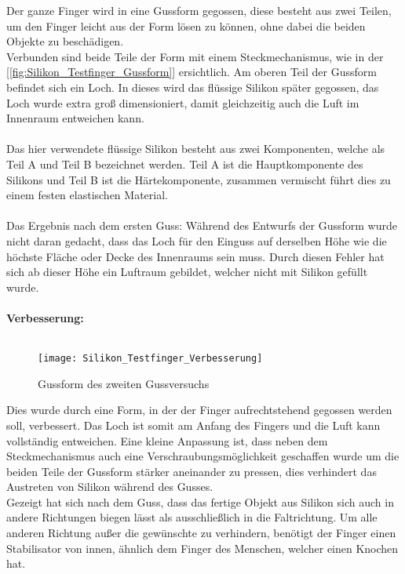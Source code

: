 \documentclass[titlepage,12pt,twoside]{article}
\begin{document}
\hfill \break
Der ganze Finger wird in eine Gussform gegossen, diese besteht aus zwei Teilen, um den Finger leicht aus der Form lösen zu können, ohne dabei die beiden Objekte zu beschädigen. \\
Verbunden sind beide Teile der Form mit einem Steckmechanismus, wie in der [\textcolor{blue}{\autoref{fig:Silikon_Testfinger_Gussform}}] ersichtlich. Am oberen Teil der Gussform befindet sich ein Loch. In dieses wird das flüssige Silikon später gegossen, das Loch wurde extra groß 
dimensioniert, damit gleichzeitig auch die Luft im Innenraum entweichen kann. \\
\\
Das hier verwendete flüssige Silikon besteht aus zwei Komponenten, welche als Teil A und Teil B bezeichnet werden. Teil A ist die Hauptkomponente des Silikons und Teil B ist die Härtekomponente, zusammen vermischt führt dies zu einem festen elastischen 
Material. \\
\\
Das Ergebnis nach dem ersten Guss: Während des Entwurfs der Gussform wurde nicht daran gedacht, dass das Loch für den Einguss auf derselben Höhe wie die höchste Fläche oder Decke des Innenraums sein muss. Durch diesen Fehler hat sich ab dieser Höhe 
ein Luftraum gebildet, welcher nicht mit Silikon gefüllt wurde. \\
\\
\textbf{Verbesserung:} \\
\\
\begin{figure}[H]
	\begin{center}
		\scalebox{0.8}
		{\texttt{[image: Silikon\_Testfinger\_Verbesserung]}}
		\caption{Gussform des zweiten Gussversuchs}
		\label{fig:Silikon_Testfinger_Verbesserung}			
	\end{center}
\end{figure}
\hfill \break
Dies wurde durch eine Form, in der der Finger aufrechtstehend gegossen werden soll, verbessert. Das Loch ist somit am Anfang des Fingers und die Luft kann vollständig entweichen. Eine kleine Anpassung ist, dass neben dem Steckmechanismus auch eine 
Verschraubungsmöglichkeit geschaffen wurde um die beiden Teile der Gussform stärker aneinander zu pressen, dies verhindert das Austreten von Silikon während des Gusses. \\
Gezeigt hat sich nach dem Guss, dass das fertige Objekt aus Silikon sich auch in andere Richtungen biegen lässt als ausschließlich in die Faltrichtung. Um alle anderen Richtung außer die gewünschte zu verhindern, benötigt der Finger einen 
Stabilisator von innen, ähnlich dem Finger des Menschen, welcher einen Knochen hat. \\
\\
\end{document}
